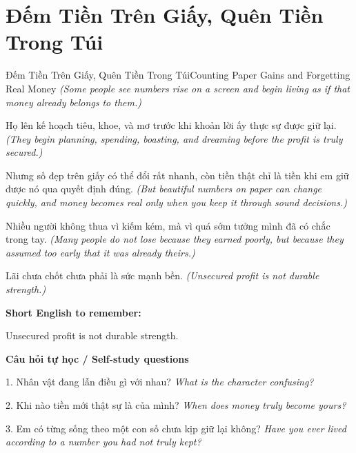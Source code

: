 \section{Đếm Tiền Trên Giấy, Quên Tiền Trong Túi}
\begin{truyen}{Đếm Tiền Trên Giấy, Quên Tiền Trong Túi}{Counting Paper Gains and Forgetting Real Money}
\textit{(Some people see numbers rise on a screen and begin living as if that money already belongs to them.)}

Họ lên kế hoạch tiêu, khoe, và mơ trước khi khoản lời ấy thực sự được giữ lại.
\textit{(They begin planning, spending, boasting, and dreaming before the profit is truly secured.)}

Nhưng số đẹp trên giấy có thể đổi rất nhanh, còn tiền thật chỉ là tiền khi em giữ được nó qua quyết định đúng.
\textit{(But beautiful numbers on paper can change quickly, and money becomes real only when you keep it through sound decisions.)}

Nhiều người không thua vì kiếm kém, mà vì quá sớm tưởng mình đã có chắc trong tay.
\textit{(Many people do not lose because they earned poorly, but because they assumed too early that it was already theirs.)}

\end{truyen}

\begin{baihoc}
Lãi chưa chốt chưa phải là sức mạnh bền.
\textit{(Unsecured profit is not durable strength.)}
\end{baihoc}

\begin{ghinhoanh}
\textbf{Short English to remember:}

Unsecured profit is not durable strength.

\end{ghinhoanh}

\begin{tuhocnhanh}
\textbf{Câu hỏi tự học / Self-study questions}

1. Nhân vật đang lẫn điều gì với nhau? \textit{What is the character confusing?}

2. Khi nào tiền mới thật sự là của mình? \textit{When does money truly become yours?}

3. Em có từng sống theo một con số chưa kịp giữ lại không? \textit{Have you ever lived according to a number you had not truly kept?}
\end{tuhocnhanh}
